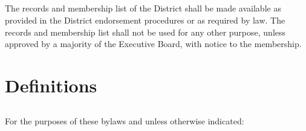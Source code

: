 \subsection{}
The records and membership list of the \fortythird{} District  shall be made available as provided in the \fortythird{} District endorsement procedures or as required by law. The records and membership list shall not be used for any other purpose, unless approved by a majority of the Executive Board, with notice to the membership.

\section{Definitions} \label{defs}
\subsection{}
For the purposes of these bylaws and unless otherwise indicated:
